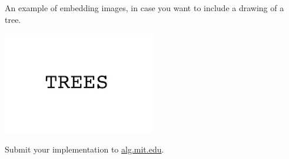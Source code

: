 \documentclass[12pt,twoside]{article}
\begin{document}


\begin{problems}

\problem  %

\begin{problemparts}
\problempart %
\problempart %
\problempart %
\problempart %
\end{problemparts}

\newpage
\problem  %

\begin{problemparts}
\problempart %
\problempart %
\problempart %
\end{problemparts}

\newpage
\problem  %

\begin{problemparts}
\problempart %
An example of embedding images, in case you want to include a drawing of a tree.
\begin{center}
  \includegraphics[width=0.5\textwidth]{img.jpg}
\end{center}
\problempart %
\problempart %
\problempart %
\end{problemparts}

\newpage
\problem  %

\begin{problemparts}
\problempart %
\problempart %
\problempart %
\problempart Submit your implementation to {\small\url{alg.mit.edu}}.
\end{problemparts}

\end{problems}
\end{document}
